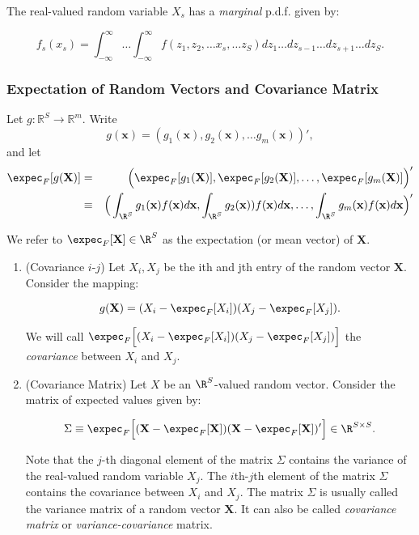 \documentclass[11pt]{article} %
\begin{document}
\noindent The real-valued random variable $X_s$ has a \emph{marginal} p.d.f. given by:

$$f_s (x_s) =\int_{-\infty}^{\infty} \ldots \int_{-\infty}^{\infty}  f(z_1, z_2, \ldots x_s, \ldots z_{S})dz_{1} \ldots dz_{s-1} \ldots dz_{s+1} \ldots  d{z_S}.  $$ 

\newpage


\subsubsection{Expectation of Random Vectors and Covariance Matrix}

Let $g: \mathbb{R}^{S} \rightarrow \mathbb{R}^{m}$.  Write
$$g(\textbf{x})=(g_1(\textbf{x}), g_2(\textbf{x}), \ldots g_{m}(\textbf{x}))',$$
\noindent and let
\begin{eqnarray*}
\expec_{F}[g(\mathbf{X})] &=& \Big( \expec_{F}[g_1(\mathbf{X})], \expec_{F}[g_2(\mathbf{X})], \ldots, \expec_{F}[g_m(\mathbf{X})] \Big)' \\
&\equiv& \Big( \int_{\R^{S}} g_1(\mathbf{x})f(\mathbf{x})d\mathbf{x}, \int_{\R^{S}} g_2(\mathbf{x}))f(\mathbf{x})d\mathbf{x}, \ldots, \int_{\R^{S}} g_m(\mathbf{x})f(\mathbf{x})d\mathbf{x}\Big)'
\end{eqnarray*}

\noindent We refer to $\expec_{F}[\mathbf{X}] \in \R^{S}$ as the expectation (or mean vector) of $\mathbf{X}$. 
\begin{enumerate}
\item (Covariance $i$-$j$) Let $X_{i}, X_{j}$ be the ith and jth entry of the random vector $\mathbf{X}$. 
 Consider the mapping:

$$g(\mathbf{X}) = (X_{i} - \expec_{F}[X_i])(X_{j} - \expec_{F}[X_j]).$$

\noindent We will call $\expec_{F}\Big[ (X_{i} - \expec_{F}[X_i])(X_{j} - \expec_{F}[X_j]) \Big]$ the \emph{covariance} between $X_i$ and $X_j$.

\item (Covariance Matrix) Let $X$ be an $\R^{S}$-valued random vector. Consider the matrix of expected values given by:

$$ \Sigma \equiv \expec_{F} \Big[ (\mathbf{X} - \expec_{F}[\mathbf{X}])(\mathbf{X} - \expec_{F}[\mathbf{X}])'\Big] \in \R^{S \times S}.$$

\noindent Note that the $j$-th diagonal element of the matrix $\Sigma$ contains the variance of the real-valued random variable $X_j$. The $i$th-$j$th element of the matrix $\Sigma$ contains the covariance between $X_i$ and $X_j$. The matrix $\Sigma$ is usually called the variance matrix of a random vector $\mathbf{X}$. It can also be called \emph{covariance matrix} or \emph{variance-covariance} matrix. 



\end{enumerate}
\end{document}
